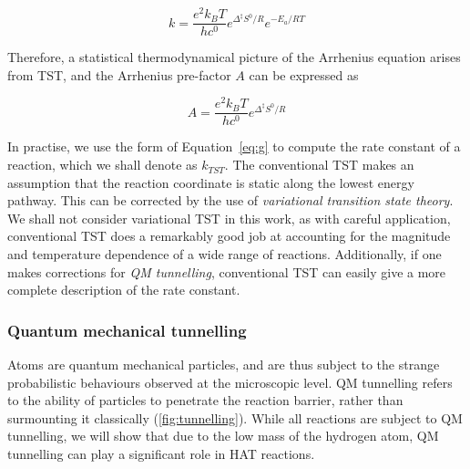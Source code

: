 \begin{equation}
  k = \frac{e^2k_B T}{hc^0}e^{\Delta^\ddagger S^0/R}e^{-E_a/RT}
\end{equation}

Therefore, a statistical thermodynamical picture of the Arrhenius equation arises from TST, and the Arrhenius pre-factor $A$ can be expressed as

\begin{equation}
  A = \frac{e^2k_B T}{hc^0}e^{\Delta^\ddagger S^0/R}
\label{eq:afactor}
\end{equation}

In practise, we use the form of Equation~\ref{eq:g} to compute the rate constant of a reaction, which we shall denote as $k_{TST}$. The conventional TST makes an assumption that the reaction coordinate is static along the lowest energy pathway. This can be corrected by the use of \emph{variational transition state theory}.\cite{Truhlar1984} We shall not consider variational TST in this work, as with careful application, conventional TST does a remarkably good job at accounting for the magnitude and temperature dependence of a wide range of reactions.\cite{Steinfeld1998} Additionally, if one makes corrections for \emph{QM tunnelling}, conventional TST can easily give a more complete description of the rate constant.

\subsubsection{Quantum mechanical tunnelling}

Atoms are quantum mechanical particles, and are thus subject to the strange probabilistic behaviours observed at the microscopic level. QM tunnelling refers to the ability of particles to penetrate the reaction barrier, rather than surmounting it classically (\ref{fig:tunnelling}). While all reactions are subject to QM tunnelling, we will show that due to the low mass of the hydrogen atom, QM tunnelling can play a significant role in HAT reactions.

